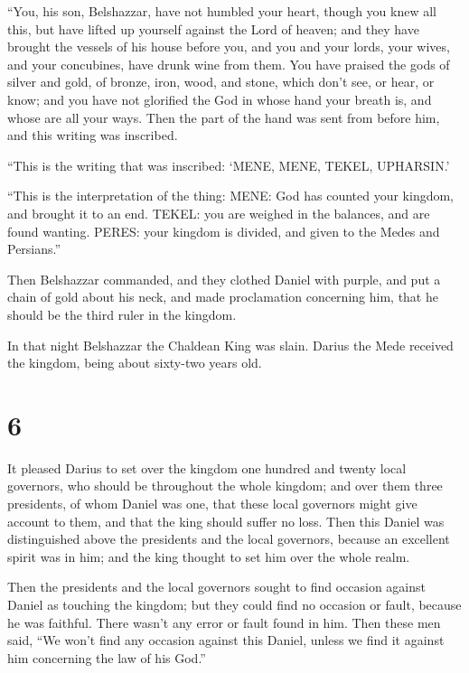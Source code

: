  ``You, his son, Belshazzar, have not humbled your heart,
though you knew all this,  but have lifted up yourself
against the Lord of heaven; and they have brought the vessels of his
house before you, and you and your lords, your wives, and your
concubines, have drunk wine from them. You have praised the gods of
silver and gold, of bronze, iron, wood, and stone, which don't see, or
hear, or know; and you have not glorified the God in whose hand your
breath is, and whose are all your ways.  Then the part of
the hand was sent from before him, and this writing was inscribed.

 ``This is the writing that was inscribed: `MENE, MENE,
TEKEL, UPHARSIN.'

 ``This is the interpretation of the thing: MENE: God has
counted your kingdom, and brought it to an end.  TEKEL: you
are weighed in the balances, and are found wanting.  PERES:
your kingdom is divided, and given to the Medes and Persians.''

 Then Belshazzar commanded, and they clothed Daniel with
purple, and put a chain of gold about his neck, and made proclamation
concerning him, that he should be the third ruler in the kingdom.

 In that night Belshazzar the Chaldean King was slain.
 Darius the Mede received the kingdom, being about
sixty-two years old.

\hypertarget{section-5}{%
\section{6}\label{section-5}}

 It pleased Darius to set over the kingdom one hundred and
twenty local governors, who should be throughout the whole kingdom;
 and over them three presidents, of whom Daniel was one,
that these local governors might give account to them, and that the king
should suffer no loss.  Then this Daniel was distinguished
above the presidents and the local governors, because an excellent
spirit was in him; and the king thought to set him over the whole realm.

 Then the presidents and the local governors sought to find
occasion against Daniel as touching the kingdom; but they could find no
occasion or fault, because he was faithful. There wasn't any error or
fault found in him.  Then these men said, ``We won't find
any occasion against this Daniel, unless we find it against him
concerning the law of his God.''

